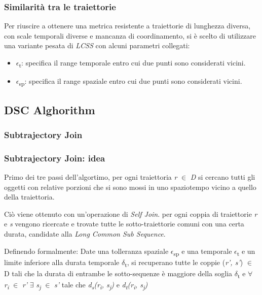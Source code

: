 \documentclass{beamer}
\begin{document}
\begin{frame}
	\frametitle{Similarità tra le traiettorie}
	Per riuscire a ottenere una metrica resistente a traiettorie di lunghezza diversa, con scale temporali diverse e mancanza di coordinamento, si è scelto di utilizzare una variante pesata di \textit{LCSS} con alcuni parametri collegati:
	\begin{itemize}
		\item $\epsilon$\textsubscript{t}: specifica il range temporale entro cui due punti sono considerati vicini.
			\item $\epsilon$\textsubscript{sp}: specifica il range spaziale entro cui due punti sono considerati vicini.
	\end{itemize}
\end{frame}


\subsection{DSC Alghorithm}

\subsubsection{Subtrajectory Join}

\begin{frame}
	\frametitle{Subtrajectory Join: idea}
	Primo dei tre passi dell'algortimo, per ogni traiettoria \textit{r} $\in$ \textit{D} si cercano tutti gli oggetti con relative porzioni che si sono mossi in uno spaziotempo vicino a quello della traiettoria.
	
	Ciò viene ottenuto con un'operazione di \textit{Self Join}. per ogni coppia di traiettorie \textit{r} e \textit{s} vengono ricercate e trovate tutte le sotto-traiettorie comuni con una certa durata, candidate alla \textit{Long Common Sub Sequence}.
	
	Definendo formalmente: Date una tolleranza spaziale  $\epsilon$\textsubscript{sp} e una temporale  $\epsilon$\textsubscript{t} e un limite inferiore alla durata temporale $\delta$\textsubscript{t}, si recuperano tutte le coppie (\textit{r', s'}) $\in$ D tali che 
	la durata di entrambe le sotto-sequenze è maggiore della soglia $\delta$\textsubscript{t} e
	$\forall$ \textit{r\textsubscript{i}} $\in$ \textit{r'} $\exists$ \textit{s\textsubscript{j}} $\in$ 
	\textit{s'} tale che \textit{d\textsubscript{s}(r\textsubscript{i}, s\textsubscript{j})} e 
	\textit{d\textsubscript{t}(r\textsubscript{i}, s\textsubscript{j})}
\end{frame}
\end{document}
